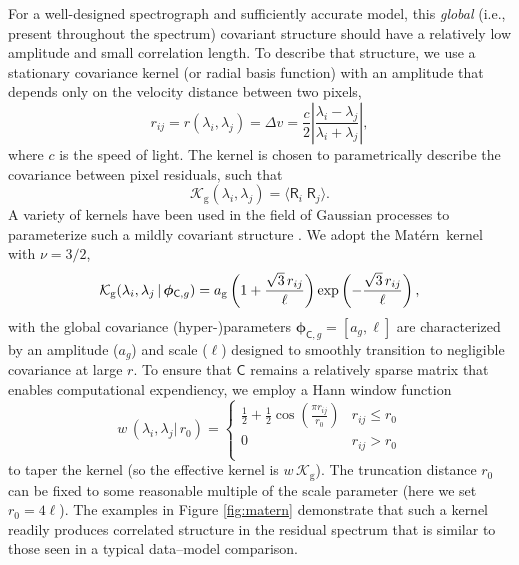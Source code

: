\documentclass[iop,floatfix]{emulateapj}
\newcommand{\vR}{\mathsf{R}}
\newcommand{\vC}{\mathsf{C}}
\newcommand{\matern}{Mat\'{e}rn}
\newcommand{\vp}{ {\bm \phi}}
\newcommand{\KK}{\mathcal{K}}
\newcommand{\Kglobal}{\KK_{\textrm{g}}}
\begin{document}
For a well-designed spectrograph and sufficiently accurate model, this {\it global} (i.e., present 
throughout the spectrum) covariant structure should have a relatively low amplitude and small 
correlation length.  To describe that structure, we use a stationary covariance kernel (or radial 
basis function) with an amplitude that depends only on the velocity distance between two pixels, 
\begin{equation}
  r_{ij} = r(\lambda_i, \lambda_j) = \Delta v = \frac{c}{2} \left | \frac{\lambda_i 
   - \lambda_j}{ \lambda_i + \lambda_j} \right |,
\end{equation}
where $c$ is the speed of light.  The kernel is chosen to parametrically describe the covariance 
between pixel residuals, such that
\begin{equation}
  \Kglobal(\lambda_i, \lambda_j) =  \langle \vR_i \; \vR_j \rangle.
  \label{eqn:expectation}
\end{equation}
A variety of kernels have been used in the field of Gaussian processes to parameterize such a 
mildly covariant structure \citep[e.g.,][]{rasmussen05}.  We adopt the \matern\ kernel with $\nu = 
3/2$,
\begin{equation}
  \Kglobal(\lambda_i, \lambda_j \, |\, \vp_{{\mathsf C}, g}) = a_{\rm g} \left(1 + \frac{\sqrt{3}\, r_{ij}}{\ell} \right ) \exp 
   \left (- \frac{\sqrt{3}\, r_{ij}}{\ell} \right ),
   \label{eqn:global}
\end{equation}
with the global covariance (hyper-)parameters $\vp_{{\mathsf C}, g} = [a_g, \ell]$ are 
characterized by an amplitude ($a_g$) and scale ($\ell$) designed to smoothly transition to 
negligible covariance at large $r$.  To ensure that $\vC$ remains a relatively sparse matrix that 
enables computational expendiency, we employ a Hann window function
\begin{equation}
  w\,(\lambda_i, \lambda_j |\, r_0) = \left \{ 
    \begin{array}{cc}
    \frac{1}{2} + \frac{1}{2} \cos \left(\frac{\pi r_{ij}}{r_0} \right) & r_{ij} \le r_0 \\
    0 & r_{ij} > r_0 \\
  \end{array}
  \right .
  \label{eqn:Hann}
\end{equation}
to taper the kernel (so the effective kernel is $w \, \Kglobal$).  The truncation distance 
$r_0$ can be fixed to some reasonable multiple of the scale parameter (here we set $r_0 = 4\ell$).  
The examples in Figure \ref{fig:matern} demonstrate that such a kernel readily produces correlated 
structure in the residual spectrum that is similar to those seen in a typical data--model 
comparison.  
\end{document}
